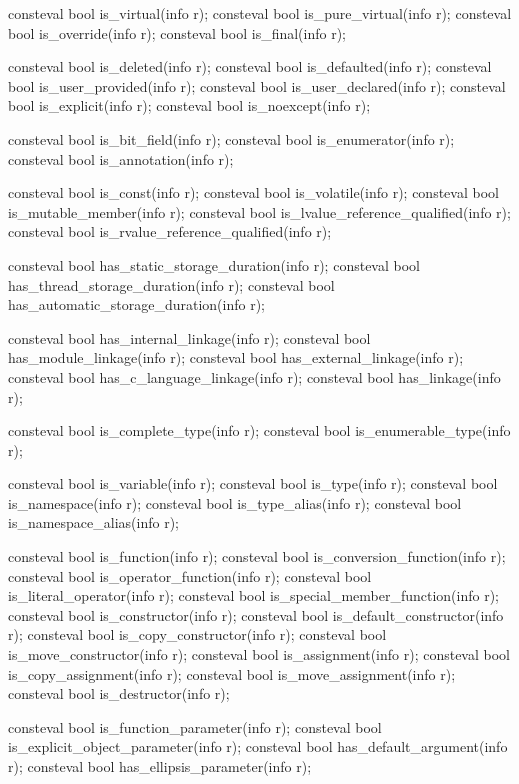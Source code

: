 \begin{codeblock}
{  consteval bool is_virtual(info r);
  consteval bool is_pure_virtual(info r);
  consteval bool is_override(info r);
  consteval bool is_final(info r);

  consteval bool is_deleted(info r);
  consteval bool is_defaulted(info r);
  consteval bool is_user_provided(info r);
  consteval bool is_user_declared(info r);
  consteval bool is_explicit(info r);
  consteval bool is_noexcept(info r);

  consteval bool is_bit_field(info r);
  consteval bool is_enumerator(info r);
  consteval bool is_annotation(info r);

  consteval bool is_const(info r);
  consteval bool is_volatile(info r);
  consteval bool is_mutable_member(info r);
  consteval bool is_lvalue_reference_qualified(info r);
  consteval bool is_rvalue_reference_qualified(info r);

  consteval bool has_static_storage_duration(info r);
  consteval bool has_thread_storage_duration(info r);
  consteval bool has_automatic_storage_duration(info r);

  consteval bool has_internal_linkage(info r);
  consteval bool has_module_linkage(info r);
  consteval bool has_external_linkage(info r);
  consteval bool has_c_language_linkage(info r);
  consteval bool has_linkage(info r);

  consteval bool is_complete_type(info r);
  consteval bool is_enumerable_type(info r);

  consteval bool is_variable(info r);
  consteval bool is_type(info r);
  consteval bool is_namespace(info r);
  consteval bool is_type_alias(info r);
  consteval bool is_namespace_alias(info r);

  consteval bool is_function(info r);
  consteval bool is_conversion_function(info r);
  consteval bool is_operator_function(info r);
  consteval bool is_literal_operator(info r);
  consteval bool is_special_member_function(info r);
  consteval bool is_constructor(info r);
  consteval bool is_default_constructor(info r);
  consteval bool is_copy_constructor(info r);
  consteval bool is_move_constructor(info r);
  consteval bool is_assignment(info r);
  consteval bool is_copy_assignment(info r);
  consteval bool is_move_assignment(info r);
  consteval bool is_destructor(info r);

  consteval bool is_function_parameter(info r);
  consteval bool is_explicit_object_parameter(info r);
  consteval bool has_default_argument(info r);
  consteval bool has_ellipsis_parameter(info r);

}
\end{codeblock}
